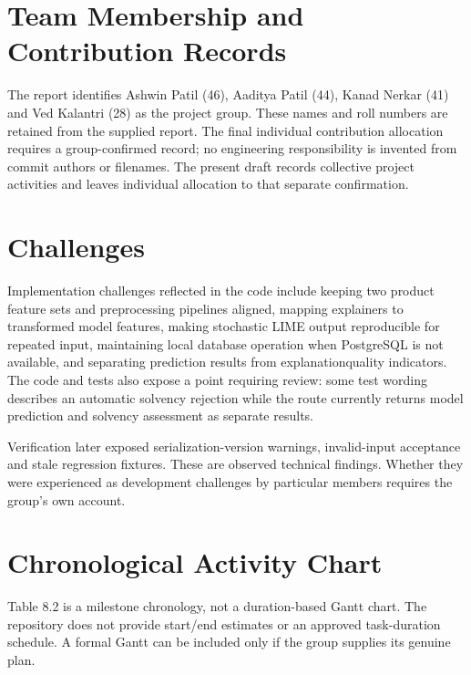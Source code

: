 \documentclass[12pt,a4paper]{report}
\begin{document}
\section{Team Membership and Contribution Records}
The report identifies Ashwin Patil (46), Aaditya Patil (44), Kanad Nerkar (41) and Ved Kalantri (28) as the project group. These names and roll numbers are retained from the supplied report. The final individual contribution allocation requires a group-confirmed record; no engineering responsibility is invented from commit authors or filenames. The present draft records collective project activities and leaves individual allocation to that separate confirmation.

\section{Challenges}
Implementation challenges reflected in the code include keeping two product feature sets and preprocessing pipelines aligned, mapping explainers to transformed model features, making stochastic LIME output reproducible for repeated input, maintaining local database operation when PostgreSQL is not available, and separating prediction results from explanationquality indicators. The code and tests also expose a point requiring review: some test wording describes an automatic solvency rejection while the route currently returns model prediction and solvency assessment as separate results.

Verification later exposed serialization-version warnings, invalid-input acceptance and stale regression fixtures. These are observed technical findings. Whether they were experienced as development challenges by particular members requires the group's own account.

\section{Chronological Activity Chart}
Table 8.2 is a milestone chronology, not a duration-based Gantt chart. The repository does not provide start/end estimates or an approved task-duration schedule. A formal Gantt can be included only if the group supplies its genuine plan.
\end{document}
